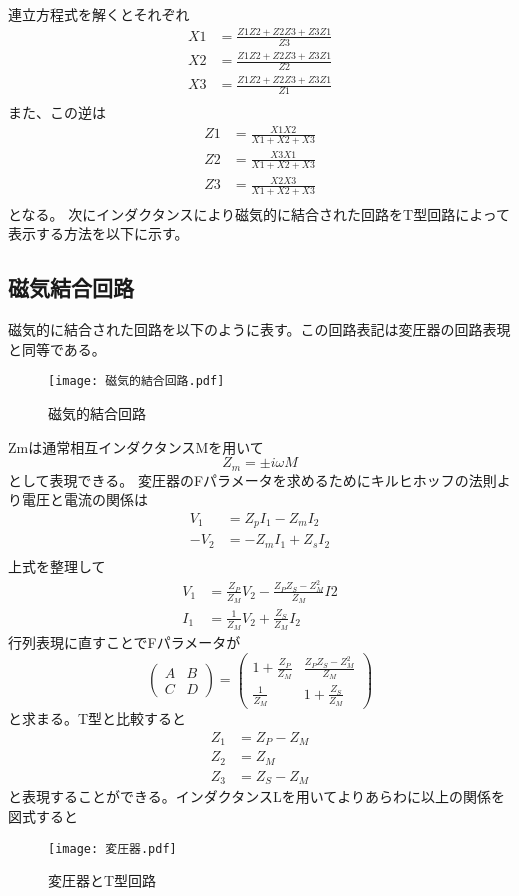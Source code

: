 連立方程式を解くとそれぞれ
\begin{eqnarray}
    X1 &= \frac{Z1Z2+Z2Z3+Z3Z1}{Z3}\\
    X2 &= \frac{Z1Z2+Z2Z3+Z3Z1}{Z2}\\
    X3 &= \frac{Z1Z2+Z2Z3+Z3Z1}{Z1}\\
\end{eqnarray}
また、この逆は
\begin{eqnarray}
    Z1 &= \frac{X1X2}{X1+X2+X3}\\
    Z2 &= \frac{X3X1}{X1+X2+X3}\\
    Z3 &= \frac{X2X3}{X1+X2+X3}\\
\end{eqnarray}
となる。
次にインダクタンスにより磁気的に結合された回路をT型回路によって表示する方法を以下に示す。
\subsection{磁気結合回路}
磁気的に結合された回路を以下のように表す。この回路表記は変圧器の回路表現と同等である。
\begin{figure}[H]
    \centering
    \texttt{[image: 磁気的結合回路.pdf]}
    \caption{磁気的結合回路}
\end{figure}
Zmは通常相互インダクタンスMを用いて
\begin{equation*}
    Z_m = \pm i\omega M
\end{equation*}
として表現できる。
変圧器のFパラメータを求めるためにキルヒホッフの法則より電圧と電流の関係は
\begin{eqnarray}
    V_1 &= Z_p I_1 -Z_m I_2\\
    -V_2 &= -Z_m I_1 + Z_s I_2\\
\end{eqnarray}
上式を整理して
\begin{eqnarray}
    V_1 &= \frac{Z_P}{Z_M}V_2 - \frac{Z_PZ_S-Z_M^2}{Z_M}I2\\
    I_1 &= \frac{1}{Z_M}V_2+\frac{Z_S}{Z_M}I_2
\end{eqnarray}
行列表現に直すことでFパラメータが
\begin{equation*}
    \begin{pmatrix}A&B\\C&D\end{pmatrix} =\begin{pmatrix}1+\frac{Z_P}{Z_M}&\frac{Z_PZ_S-Z_M^2}{Z_M}\\\frac{1}{Z_M}&1+\frac{Z_S}{Z_M}\end{pmatrix}
\end{equation*}
と求まる。T型と比較すると
\begin{eqnarray}
    Z_1 &= Z_P-Z_M\\
    Z_2 &= Z_M\\
    Z_3 &= Z_S-Z_M
\end{eqnarray}
と表現することができる。インダクタンスLを用いてよりあらわに以上の関係を図式すると
\begin{figure}[H]
    \centering
    \texttt{[image: 変圧器.pdf]}
    \caption{変圧器とT型回路}
\end{figure}
